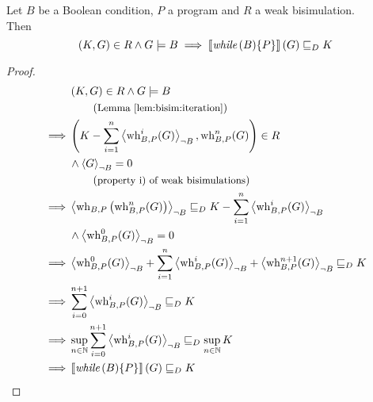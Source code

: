 \begin{theorem}[continues=theo:bisim:overapprox, label=proof:bisim:overapprox]
	Let $B$ be a Boolean condition, $P$ a program and $R$ a weak bisimulation. \\
	Then \[ \pair{K, G} \in R \land G \models B
		\implies \smtx{\while{B}{P}}(G) \leqD K \]
	\begin{proof}
		\begin{align*}
					 & \pair{K, G} \in R \land G \models B \\
					 & \explain{Lemma~\ref{lem:bisim:iteration}} \\
			\implies & \pair{K - \sum_{i = 1}^{n} \resN{\wh^i(G)}, \wh^n(G)} \in R \\
					 & \land \resN{G} = 0 \\
					 & \explain{property i) of weak bisimulations} \\
			\implies & \resN{\wh\left(\wh^n(G)\right)}
				\leqD K - \sum_{i=1}^n \resN{\wh^i(G)} \\
					 & \land \resN{\wh^0(G)} = 0 \\
			\implies & \resN{\wh^0(G)} + \sum_{i=1}^n \resN{\wh^i(G)} + \resN{\wh^{n+1}(G)} \leqD K \\
			\implies & \sum_{i=0}^{n+1} \resN{\wh^i(G)} \leqD K \\
			\implies & \sup_{n \in \N} \sum_{i=0}^{n+1} \resN{\wh^i(G)}
				\leqD \sup_{n \in \N} K \\
			\implies & \smtx{\while{B}{P}}(G) \leqD K
		\end{align*}
	\end{proof}
\end{theorem}

